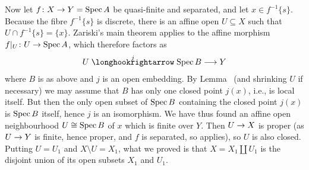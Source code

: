 \documentclass[a4paper,parskip=half,numbers=enddot, DIV=12]{scrreprt}
\begin{document}
Now let $f\colon X\morphism Y=\Spec A$ be quasi-finite and separated, and let $x\in f^{-1}\{s\}$. Because the fibre $f^{-1}\{s\}$ is discrete, there is an affine open $U\subseteq X$ such that $U\cap f^{-1}\{s\}=\{x\}$. Zariski's main theorem applies to the affine morphism $f|_U\colon U\morphism \Spec A$, which therefore factors as
\begin{align*}
	U\monomorphism[j]\Spec B\morphism Y
\end{align*}
where $B$ is as above and $j$ is an open embedding. By Lemma~ (and shrinking $U$ if necessary) we may assume that $B$ has only one closed point $j(x)$, i.e., is local itself. But then the only open subset of $\operatorname{Spec} B$ containing the closed point $j(x)$ is $\operatorname{Spec} B$ itself, hence $j$ is an isomorphism. We have thus found an affine open neighbourhood $U\cong \operatorname{Spec} B$ of $x$ which is finite over $Y$. Then $U\morphism X$ is proper (as $U\morphism Y$ is finite, hence proper, and $f$ is separated, so \cite[Proposition~2.4.1]{alggeo2} applies), so $U$ is also closed. Putting $U=U_1$ and $X\setminus U=X_1$, what we proved is that $X=X_1\amalg U_1$ is the disjoint union of its open subsets $X_1$ and $U_1$.
\end{document}
